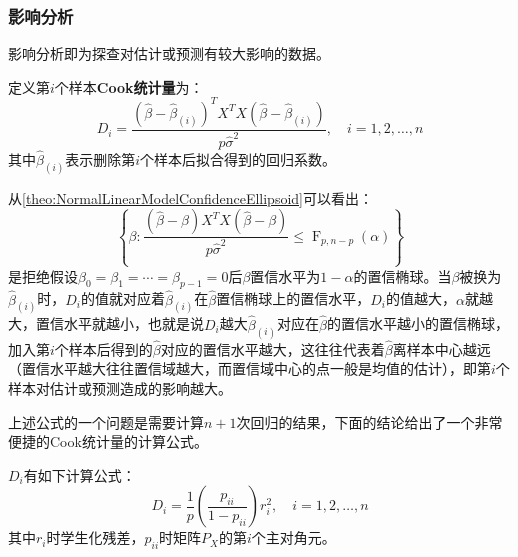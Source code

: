 \subsubsection{影响分析}
影响分析即为探查对估计或预测有较大影响的数据。
\begin{definition}
	定义第$i$个样本\textbf{Cook统计量}为：
	\begin{equation*}
		D_i=\frac{(\hat{\beta}-\hat{\beta}_{(i)})^TX^TX(\hat{\beta}-\hat{\beta}_{(i)})}{p\hat{\sigma}^2},\quad i=1,2,\dots,n
	\end{equation*}
	其中$\hat{\beta}_{(i)}$表示删除第$i$个样本后拟合得到的回归系数。
\end{definition}
\begin{note}
	从\cref{theo:NormalLinearModelConfidenceEllipsoid}可以看出：
	\begin{equation*}
		\left\{\beta:\frac{(\hat{\beta}-\beta)X^TX(\hat{\beta}-\beta)}{p\hat{\sigma}^2}\leqslant\operatorname{F}_{p,n-p}(\alpha)\right\}
	\end{equation*}
	是拒绝假设$\beta_0=\beta_1=\cdots=\beta_{p-1}=0$后$\beta$置信水平为$1-\alpha$的置信椭球。当$\beta$被换为$\hat{\beta}_{(i)}$时，$D_i$的值就对应着$\hat{\beta}_{(i)}$在$\hat{\beta}$置信椭球上的置信水平，$D_i$的值越大，$\alpha$就越大，置信水平就越小，也就是说$D_i$越大$\hat{\beta}_{(i)}$对应在$\hat{\beta}$的置信水平越小的置信椭球，加入第$i$个样本后得到的$\hat{\beta}$对应的置信水平越大，这往往代表着$\hat{\beta}$离样本中心越远（置信水平越大往往置信域越大，而置信域中心的点一般是均值的估计），即第$i$个样本对估计或预测造成的影响越大。\par
	上述公式的一个问题是需要计算$n+1$次回归的结果，下面的结论给出了一个非常便捷的Cook统计量的计算公式。
\end{note}
\begin{theorem}
	$D_i$有如下计算公式：
	\begin{equation*}
		D_i=\frac{1}{p}\left(\frac{p_{ii}}{1-p_{ii}}\right)r_i^2,\quad i=1,2,\dots,n
	\end{equation*}
	其中$r_i$时学生化残差，$p_{ii}$时矩阵$P_X$的第$i$个主对角元。
\end{theorem}
